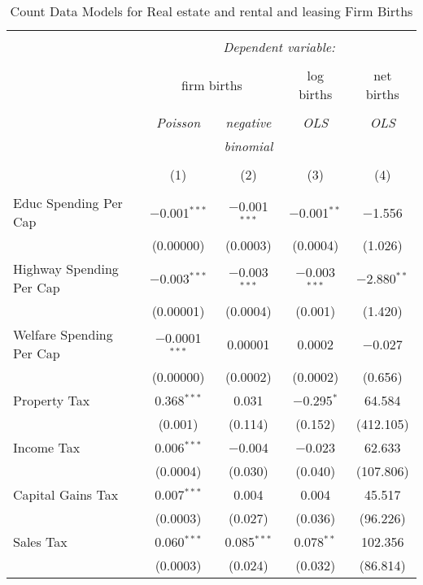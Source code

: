 
\begin{table}[!htbp] \centering 
  \caption{Count Data Models for Real estate and rental and leasing Firm Births} 
  \label{} 
\begin{tabular}{@{\extracolsep{5pt}}lcccc} 
\\[-1.8ex]\hline 
\hline \\[-1.8ex] 
 & \multicolumn{4}{c}{\textit{Dependent variable:}} \\ 
\cline{2-5} 
\\[-1.8ex] & \multicolumn{2}{c}{firm births} & log births & net births \\ 
\\[-1.8ex] & \textit{Poisson} & \textit{negative} & \textit{OLS} & \textit{OLS} \\ 
 & \textit{} & \textit{binomial} & \textit{} & \textit{} \\ 
\\[-1.8ex] & (1) & (2) & (3) & (4)\\ 
\hline \\[-1.8ex] 
 Educ Spending Per Cap & $-$0.001$^{***}$ & $-$0.001$^{***}$ & $-$0.001$^{**}$ & $-$1.556 \\ 
  & (0.00000) & (0.0003) & (0.0004) & (1.026) \\ 
  Highway Spending Per Cap  & $-$0.003$^{***}$ & $-$0.003$^{***}$ & $-$0.003$^{***}$ & $-$2.880$^{**}$ \\ 
  & (0.00001) & (0.0004) & (0.001) & (1.420) \\ 
  Welfare Spending Per Cap  & $-$0.0001$^{***}$ & 0.00001 & 0.0002 & $-$0.027 \\ 
  & (0.00000) & (0.0002) & (0.0002) & (0.656) \\ 
  Property Tax & 0.368$^{***}$ & 0.031 & $-$0.295$^{*}$ & 64.584 \\ 
  & (0.001) & (0.114) & (0.152) & (412.105) \\ 
  Income Tax & 0.006$^{***}$ & $-$0.004 & $-$0.023 & 62.633 \\ 
  & (0.0004) & (0.030) & (0.040) & (107.806) \\ 
  Capital Gains Tax & 0.007$^{***}$ & 0.004 & 0.004 & 45.517 \\ 
  & (0.0003) & (0.027) & (0.036) & (96.226) \\ 
  Sales Tax & 0.060$^{***}$ & 0.085$^{***}$ & 0.078$^{**}$ & 102.356 \\ 
  & (0.0003) & (0.024) & (0.032) & (86.814) \\ 

\end{tabular}
\end{table}
